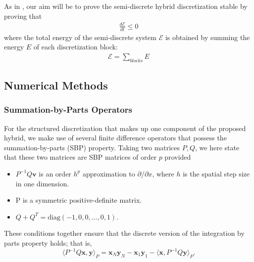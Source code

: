 As in \cite{kozdon2016stable}, our aim will be to prove the semi-discrete hybrid discretization
stable by proving that
\begin{align}
\frac{d\mathcal{E}}{dt} \leq 0
\end{align}
where the total energy of the semi-discrete system $\mathcal{E}$ is obtained by summing the
energy $E$ of each discretization block:
\begin{align}
\mathcal{E} = \sum_{blocks} E
\end{align}

\subsection{Numerical Methods}

\subsubsection{Summation-by-Parts Operators}

For the structured discretization that makes up one component of the proposed hybrid, we make use of several
finite difference operators that possess the summation-by-parts (SBP) property. Taking two matrices
${P,Q}$, we here state that these two matrices are SBP matrices of order $p$ provided 
\begin{itemize}
\item $P^{-1}Q\mathbf{v}$ is an order $h^{p}$ approximation to $\partial/\partial x$, where $h$ is the spatial step size in one dimension.
\item P is a symmetric positive-definite matrix.
\item $Q + Q^{T} = \text{diag}(-1,0,0,...,0,1)$.
\end{itemize}
These conditions together ensure that the discrete version of the integration by parts property holds; that is,
\[\langle P^{-1}Q\mathbf{x},\mathbf{y}\rangle_{P} = \mathbf{x}_{N}\mathbf{y}_{N} -  \mathbf{x}_{1}\mathbf{y}_{1} - \langle \mathbf{x},P^{-1}Q\mathbf{y}\rangle _{P}. \]

